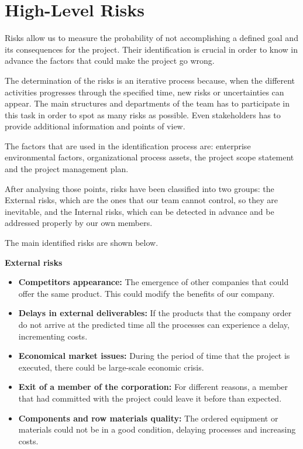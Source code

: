 \section{High-Level Risks}

Risks allow us to measure the probability of not accomplishing a defined goal and its consequences for the project. Their identification is crucial in order to know in advance the factors that could make the project go wrong.

The determination of the risks is an iterative process because, when the different activities progresses through the specified time, new risks or uncertainties can appear. The main structures and departments of the team has to participate in this task in order to spot as many risks as possible. Even stakeholders has to provide additional information and points of view.

The factors that are used in the identification process are: enterprise environmental factors, organizational process assets, the project scope statement and the project management plan.

After analysing those points, risks have been classified into two groups: the External risks, which are the ones that our team cannot control, so they are inevitable, and the Internal risks, which can be detected in advance and be addressed properly by our own members.

The main identified risks are shown below.

\textbf{External risks}

\begin{itemize}
	
	\item \textbf{Competitors appearance:} The emergence of other companies that could offer the same product. This could modify the benefits of our company.
	
	\item \textbf{Delays in external deliverables:} If the products that the company order do not arrive at the predicted time all the processes can experience a delay, incrementing costs.
	
	\item \textbf{Economical market issues:} During the period of time that the project is executed, there could be large-scale economic crisis.
	
	\item \textbf{Exit of a member of the corporation:} For different reasons, a member that had committed with the project could leave it before than expected.
	
	\item \textbf{Components and row materials quality:} The ordered equipment or materials could not be in a good condition, delaying processes and increasing costs.
	
\end{itemize}

